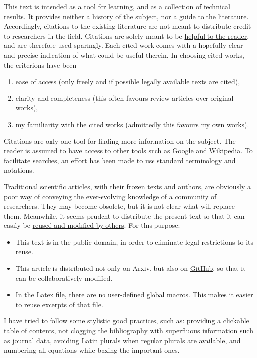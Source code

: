 \documentclass[12pt, a4paper, notitlepage, twoside]{report}
\numberwithin{equation}{section}
\theoremstyle{break}
\begin{document}
This text is intended as a tool for learning, and as a collection of technical results.
It provides neither a history of the subject, nor a guide to the literature.
Accordingly, citations to the existing literature are not meant to distribute credit to researchers in the field.
Citations are solely meant to be 
\href{http://researchpracticesandtools.blogspot.fr/2013/08/write-for-humans-not-for-robots.html}
{helpful to the reader}, and are therefore used sparingly.
Each cited work comes with a hopefully clear and precise indication of what could be useful therein.
In choosing cited works, the criterions have been
\begin{enumerate}
\item ease of access (only freely and if possible legally available texts are cited), 
\item clarity and completeness (this often favours review articles over original works),
\item my familiarity with the cited works (admittedly this favours my own works). 
\end{enumerate}
Citations are only one tool for finding more information on the subject. 
The reader is assumed to have access to other tools such as Google and Wikipedia. 
To facilitate searches, an effort has been made to use standard terminology and notations. 

Traditional scientific articles, with their frozen texts and authors, are obviously a poor way of conveying the ever-evolving knowledge of a community of researchers.
They may become obsolete, but it is not clear what will replace them.
Meanwhile, it seems prudent to distribute the present text so that it can easily be 
\href{http://researchpracticesandtools.blogspot.fr/2014/02/the-case-for-emancipating-articles-from.html}
{reused and modified by others}.
For this purpose:
\begin{itemize}
 \item This text is in the public domain, in order to eliminate legal restrictions to its reuse. 
\item This article is distributed not only on Arxiv, but also on \href{https://github.com/ribault/CFT-Review}{GitHub}, so that it can be collaboratively modified. 
\item In the Latex file, there are no user-defined global macros.
This makes it easier to reuse excerpts of that file. 
\end{itemize}

I have tried to follow some stylistic good practices, such as: providing a clickable table of contents, not clogging the bibliography with superfluous information such as journal data, \href{http://researchpracticesandtools.blogspot.fr/2018/01/will-no-one-rid-me-of-these-tiresome.html}{avoiding Latin plurals} when regular plurals are available, and numbering all equations while boxing the important ones. 
\end{document}
